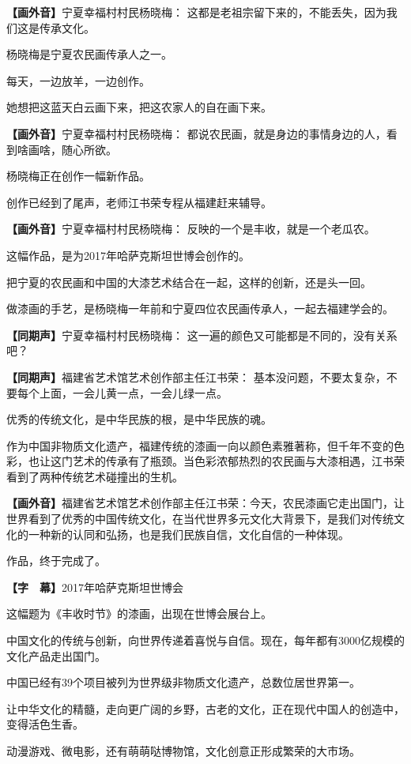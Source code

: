 \documentclass{ctexart}
\newcommand{\zkh}[1]{\textbf{\hspace{-2.7em} 【#1】}}
\begin{document}
 \zkh{画外音}宁夏幸福村村民杨晓梅： 这都是老祖宗留下来的，不能丢失，因为我们这是传承文化。

 杨晓梅是宁夏农民画传承人之一。

 每天，一边放羊，一边创作。

 她想把这蓝天白云画下来，把这农家人的自在画下来。

 \zkh{画外音}宁夏幸福村村民杨晓梅： 都说农民画，就是身边的事情身边的人，看到啥画啥，随心所欲。

 杨晓梅正在创作一幅新作品。

 创作已经到了尾声，老师江书荣专程从福建赶来辅导。

 \zkh{画外音}宁夏幸福村村民杨晓梅： 反映的一个是丰收，就是一个老瓜农。

 这幅作品，是为2017年哈萨克斯坦世博会创作的。

 把宁夏的农民画和中国的大漆艺术结合在一起，这样的创新，还是头一回。

 做漆画的手艺，是杨晓梅一年前和宁夏四位农民画传承人，一起去福建学会的。

 \zkh{同期声}宁夏幸福村村民杨晓梅： 这一遍的颜色又可能都是不同的，没有关系吧？

 \zkh{同期声}福建省艺术馆艺术创作部主任江书荣： 基本没问题，不要太复杂，不要每个上面，一会儿黄一点，一会儿绿一点。

 优秀的传统文化，是中华民族的根，是中华民族的魂。

作为中国非物质文化遗产，福建传统的漆画一向以颜色素雅著称，但千年不变的色彩，也让这门艺术的传承有了瓶颈。当色彩浓郁热烈的农民画与大漆相遇，江书荣看到了两种传统艺术碰撞出的生机。

 \zkh{画外音}福建省艺术馆艺术创作部主任江书荣：今天，农民漆画它走出国门，让世界看到了优秀的中国传统文化，在当代世界多元文化大背景下，是我们对传统文化的一种新的认同和弘扬，也是我们民族自信，文化自信的一种体现。

 作品，终于完成了。

 \zkh{字　幕}2017年哈萨克斯坦世博会

 这幅题为《丰收时节》的漆画，出现在世博会展台上。

中国文化的传统与创新，向世界传递着喜悦与自信。现在，每年都有3000亿规模的文化产品走出国门。

 中国已经有39个项目被列为世界级非物质文化遗产，总数位居世界第一。

让中华文化的精髓，走向更广阔的乡野，古老的文化，正在现代中国人的创造中，变得活色生香。

 动漫游戏、微电影，还有萌萌哒博物馆，文化创意正形成繁荣的大市场。
\end{document}
